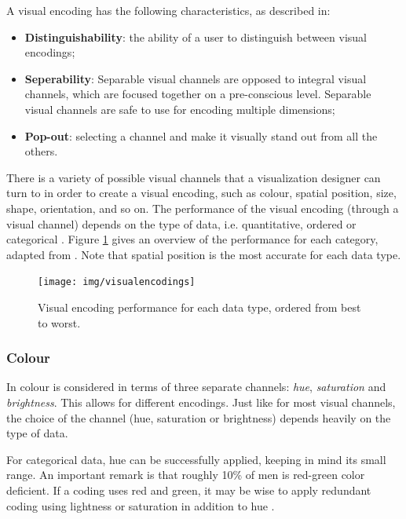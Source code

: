 A visual encoding has the following characteristics, as described in\cite{shirley:2009}:

\begin{itemize}
	\item \textbf{Distinguishability}: the ability of a user to distinguish between visual encodings;
	\item \textbf{Seperability}: Separable visual channels are opposed to integral visual channels, which are focused together on a pre-conscious level. Separable visual channels are safe to use for encoding multiple dimensions;
	\item \textbf{Pop-out}: selecting a channel and make it visually stand out from all the others.
\end{itemize}


There is a variety of possible visual channels that a visualization designer can turn to in order to create a visual encoding, such as colour, spatial position, size, shape, orientation, and so on. The performance of the visual encoding (through a visual channel) depends on the type of data, i.e. quantitative, ordered or categorical \cite{shirley:2009}. Figure \ref{figure:encodings} gives an overview of the performance for each category, adapted from \cite{shirley:2009}. Note that spatial position is the most accurate for each data type\cite{shirley:2009}.

\begin{figure}%
	\begin{center}
		\texttt{[image: img/visualencodings]}%
	\end{center}
	\caption{Visual encoding performance for each data type, ordered from best to worst.}%
	\label{figure:encodings}%
\end{figure}


\subsubsection{Colour}

In \cite{shirley:2009} colour is considered in terms of three separate channels: \emph{hue}, \emph{saturation} and \emph{brightness}. This allows for different encodings. Just like for most visual channels, the choice of the channel (hue, saturation or brightness) depends heavily on the type of data.

For categorical data, hue can be successfully applied, keeping in mind its small range. An important remark is that roughly 10\% of men is red-green color deficient. If a coding uses red and green, it may be wise to apply redundant coding using lightness or saturation in addition to hue \cite{shirley:2009}.

